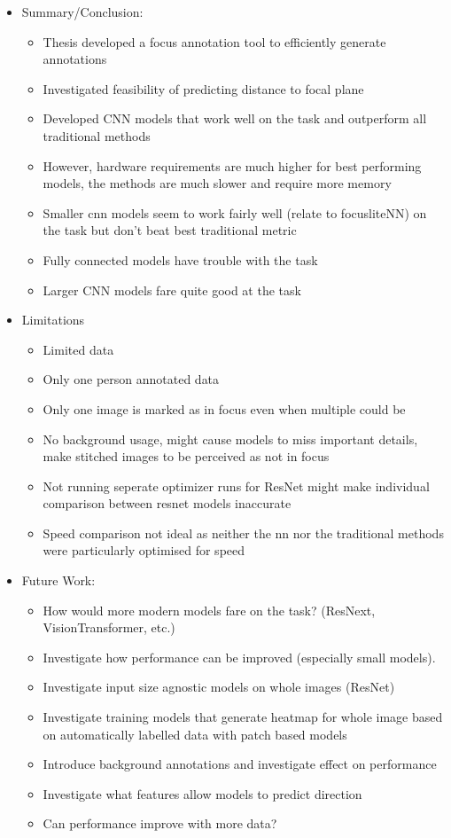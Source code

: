 \begin{itemize}
    \item Summary/Conclusion:
    \begin{itemize}
        \item Thesis developed a focus annotation tool to efficiently generate annotations
        \item Investigated feasibility of predicting distance to focal plane

        \item Developed CNN models that work well on the task and outperform all traditional methods
        \item However, hardware requirements are much higher for best performing models, the methods are much slower and require more memory
        \item Smaller cnn models seem to work fairly well (relate to focusliteNN) on the task but don't beat best traditional metric
        \item Fully connected models have trouble with the task
        \item Larger CNN models fare quite good at the task
    \end{itemize}

    \item Limitations
    \begin{itemize}
        \item Limited data
        \item Only one person annotated data
        \item Only one image is marked as in focus even when multiple could be
        \item No background usage, might cause models to miss important details, make stitched images to be perceived as not in focus
        \item Not running seperate optimizer runs for ResNet might make individual comparison between resnet models inaccurate
        \item Speed comparison not ideal as neither the nn nor the traditional methods were particularly optimised for speed
    \end{itemize}

    \item Future Work:
    \begin{itemize}
        \item How would more modern models fare on the task? (ResNext, VisionTransformer, etc.)
        \item Investigate how performance can be improved (especially small models).
        \item Investigate input size agnostic models on whole images (ResNet)
        \item Investigate training models that generate heatmap for whole image based on automatically labelled data with patch based models
        \item Introduce background annotations and investigate effect on performance
        \item Investigate what features allow models to predict direction
        \item Can performance improve with more data?
    \end{itemize}
\end{itemize}
